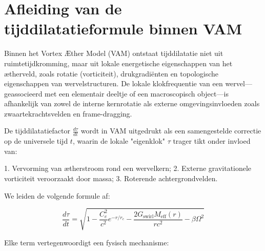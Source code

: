 
\section{Afleiding van de tijddilatatieformule binnen VAM}\label{sec:appendix_1}

Binnen het Vortex Æther Model (VAM) ontstaat tijddilatatie niet uit ruimtetijdkromming, maar uit lokale energetische eigenschappen van het ætherveld, zoals rotatie (vorticiteit), drukgradiënten en topologische eigenschappen van wervelstructuren. De lokale klokfrequentie van een wervel—geassocieerd met een elementair deeltje of een macroscopisch object—is afhankelijk van zowel de interne kernrotatie als externe omgevingsinvloeden zoals zwaartekrachtsvelden en frame-dragging.

De tijddilatatiefactor $\frac{d\tau}{dt}$ wordt in VAM uitgedrukt als een samengestelde correctie op de universele tijd $t$, waarin de lokale "eigenklok" $\tau$ trager tikt onder invloed van:

1. Vervorming van ætherstroom rond een wervelkern;
2. Externe gravitationele vorticiteit veroorzaakt door massa;
3. Roterende achtergrondvelden.

We leiden de volgende formule af:

\begin{equation}
\frac{d\tau}{dt} = \sqrt{1 - \frac{C_e^2}{c^2} e^{-r/r_c} - \frac{2G_\text{swirl} M_\text{eff}(r)}{r c^2} - \beta \Omega^2}
\end{equation}

Elke term vertegenwoordigt een fysisch mechanisme:

